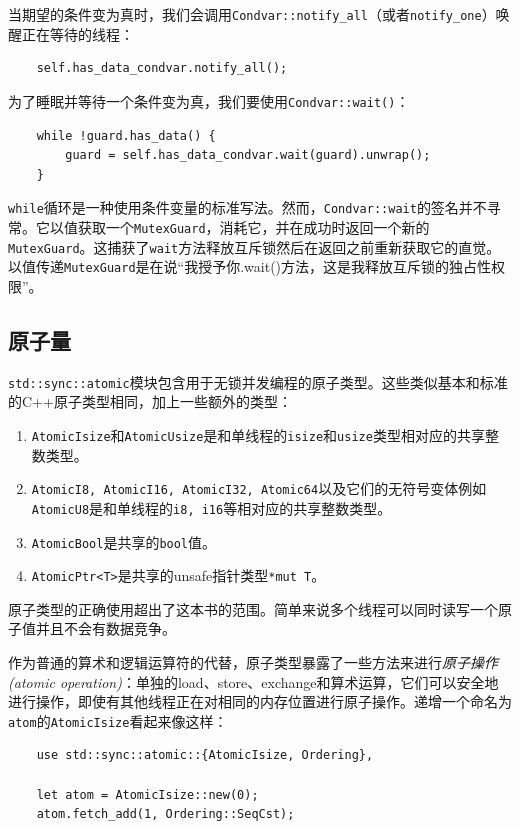 当期望的条件变为真时，我们会调用\texttt{Condvar::notify\_all}（或者\texttt{notify\_one}）唤醒正在等待的线程：
\begin{verbatim}
    self.has_data_condvar.notify_all();
\end{verbatim}

为了睡眠并等待一个条件变为真，我们要使用\texttt{Condvar::wait()}：
\begin{verbatim}
    while !guard.has_data() {
        guard = self.has_data_condvar.wait(guard).unwrap();
    }
\end{verbatim}

\texttt{while}循环是一种使用条件变量的标准写法。然而，\texttt{Condvar::wait}的签名并不寻常。它以值获取一个\texttt{MutexGuard}，消耗它，并在成功时返回一个新的\texttt{MutexGuard}。这捕获了\texttt{wait}方法释放互斥锁然后在返回之前重新获取它的直觉。以值传递\texttt{MutexGuard}是在说“我授予你.wait()方法，这是我释放互斥锁的独占性权限”。

\subsection{原子量}\label{atomic}
\texttt{std::sync::atomic}模块包含用于无锁并发编程的原子类型。这些类似基本和标准的C++原子类型相同，加上一些额外的类型：
\begin{enumerate}
    \item \texttt{AtomicIsize}和\texttt{AtomicUsize}是和单线程的\texttt{isize}和\texttt{usize}类型相对应的共享整数类型。
    \item \texttt{AtomicI8, AtomicI16, AtomicI32, Atomic64}以及它们的无符号变体例如\texttt{AtomicU8}是和单线程的\texttt{i8, i16}等相对应的共享整数类型。
    \item \texttt{AtomicBool}是共享的\texttt{bool}值。
    \item \texttt{AtomicPtr<T>}是共享的unsafe指针类型\texttt{*mut T}。
\end{enumerate}

原子类型的正确使用超出了这本书的范围。简单来说多个线程可以同时读写一个原子值并且不会有数据竞争。

作为普通的算术和逻辑运算符的代替，原子类型暴露了一些方法来进行\emph{原子操作(atomic operation)}：单独的load、store、exchange和算术运算，它们可以安全地进行操作，即使有其他线程正在对相同的内存位置进行原子操作。递增一个命名为\texttt{atom}的\texttt{AtomicIsize}看起来像这样：
\begin{verbatim}
    use std::sync::atomic::{AtomicIsize, Ordering},

    let atom = AtomicIsize::new(0);
    atom.fetch_add(1, Ordering::SeqCst);
\end{verbatim}

